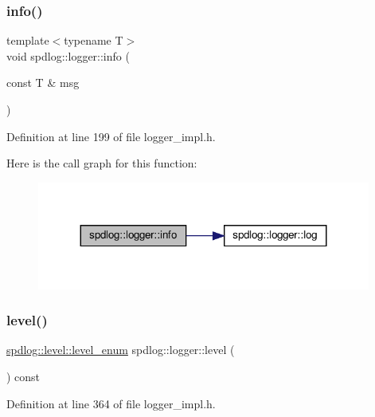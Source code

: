 \subsubsection{\texorpdfstring{info()}{info()}\hspace{0.1cm}{\footnotesize\ttfamily [2/2]}}
{\footnotesize\ttfamily template$<$typename T$>$ \\
void spdlog\+::logger\+::info (\begin{DoxyParamCaption}\item[{const T \&}]{msg }\end{DoxyParamCaption})\hspace{0.3cm}{\ttfamily [inline]}}



Definition at line 199 of file logger\+\_\+impl.\+h.

Here is the call graph for this function\+:
\nopagebreak
\begin{figure}[H]
\begin{center}
\leavevmode
\includegraphics[width=311pt]{classspdlog_1_1logger_a1e1dff0caa0d1bf072739dfcc1e331d8_cgraph}
\end{center}
\end{figure}
\mbox{\label{classspdlog_1_1logger_a20dc8198d08c98f84ae10be635108bef}} 
\subsubsection{\texorpdfstring{level()}{level()}}
{\footnotesize\ttfamily \hyperlink{namespacespdlog_1_1level_a35f5227e5daf228d28a207b7b2aefc8b}{spdlog\+::level\+::level\+\_\+enum} spdlog\+::logger\+::level (\begin{DoxyParamCaption}{ }\end{DoxyParamCaption}) const\hspace{0.3cm}{\ttfamily [inline]}}



Definition at line 364 of file logger\+\_\+impl.\+h.

